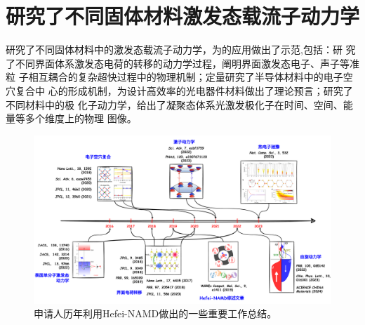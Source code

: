 \section{研究了不同固体材料激发态载流子动力学}
\begin{center}
  \begin{InnovationBox}
    研究了不同固体材料中的激发态载流子动力学，为\hnamd{}的应用做出了示范,包括：研
    究了不同界面体系激发态电荷的转移的动力学过程，阐明界面激发态电子、声子等准粒
    子相互耦合的复杂超快过程中的物理机制；定量研究了半导体材料中的电子空穴复合中
    心的形成机制，为设计高效率的光电器件材料做出了理论预言；研究了不同材料中的极
    化子动力学，给出了凝聚态体系光激发极化子在时间、空间、能量等多个维度上的物理
    图像。
  \end{InnovationBox}
\end{center}

\begin{figure}
  \centering
  \includegraphics[width=1.\linewidth]{figs/rep_work.pdf}
  \caption{\label{fig:fig_rep_work}
    \kaishu{}%
    申请人历年利用Hefei-NAMD做出的一些重要工作总结。
  }
\end{figure}


